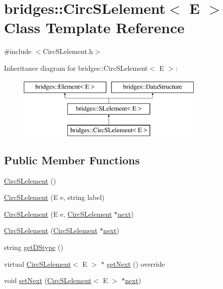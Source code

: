 \hypertarget{classbridges_1_1_circ_s_lelement}{}\section{bridges\+:\+:Circ\+S\+Lelement$<$ E $>$ Class Template Reference}
\label{classbridges_1_1_circ_s_lelement}


{\ttfamily \#include $<$Circ\+S\+Lelement.\+h$>$}

Inheritance diagram for bridges\+:\+:Circ\+S\+Lelement$<$ E $>$\+:\begin{figure}[H]
\begin{center}
\leavevmode
\includegraphics[height=3.000000cm]{classbridges_1_1_circ_s_lelement}
\end{center}
\end{figure}
\subsection*{Public Member Functions}
\begin{DoxyCompactItemize}
\item 
\hyperlink{classbridges_1_1_circ_s_lelement_a86183d3487b906550d8f32bda3a68f98}{Circ\+S\+Lelement} ()
\item 
\hyperlink{classbridges_1_1_circ_s_lelement_a517f312beca94ef2c55721a3599590f8}{Circ\+S\+Lelement} (E e, string label)
\item 
\hyperlink{classbridges_1_1_circ_s_lelement_a6394498ffc6f2b2af65f500f8802ab0b}{Circ\+S\+Lelement} (E e, \hyperlink{classbridges_1_1_circ_s_lelement}{Circ\+S\+Lelement} $\ast$\hyperlink{classbridges_1_1_s_lelement_ad7449d10a09ebc52653a7baed812aa43}{next})
\item 
\hyperlink{classbridges_1_1_circ_s_lelement_a1fda146fc0da1d8c7d6440cbbbb2ce42}{Circ\+S\+Lelement} (\hyperlink{classbridges_1_1_circ_s_lelement}{Circ\+S\+Lelement} $\ast$\hyperlink{classbridges_1_1_s_lelement_ad7449d10a09ebc52653a7baed812aa43}{next})
\item 
string \hyperlink{classbridges_1_1_circ_s_lelement_adc203513015408e6f370138acf4815ed}{get\+D\+Stype} ()
\item 
virtual \hyperlink{classbridges_1_1_circ_s_lelement}{Circ\+S\+Lelement}$<$ E $>$ $\ast$ \hyperlink{classbridges_1_1_circ_s_lelement_aab863627c125c6f1075af7e7b7f340cf}{get\+Next} () override
\item 
void \hyperlink{classbridges_1_1_circ_s_lelement_a7b2512dd1cc559f0a89d9ab4aafed172}{set\+Next} (\hyperlink{classbridges_1_1_circ_s_lelement}{Circ\+S\+Lelement}$<$ E $>$ $\ast$\hyperlink{classbridges_1_1_s_lelement_ad7449d10a09ebc52653a7baed812aa43}{next})
\end{DoxyCompactItemize}
